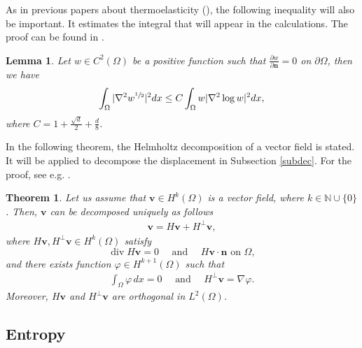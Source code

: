 \documentclass[11pt]{article}
\numberwithin{equation}{section}
\theoremstyle{plain}
\newtheorem{tw}[defi]{Theorem}
\newtheorem{lem}[defi]{Lemma}
\newcommand\bb[1]{\mathbf{#1}}
\newcommand{\n}{\mathbb{N}}
\newcommand{\tn}{\Omega}
\newcommand{\io}{\int_{\Omega}}
\newcommand{\sul}{\sfrac{1}{2}}
\newcommand{\hp}{H^{\perp}}
\newcommand{\ant}{\quad\textrm{ and }\quad}
\renewcommand{\div}{\operatorname{div}}
\let \phi\varphi
\begin{document}
As in previous papers about thermoelasticity (\cite{BC2, Biest, BC}), the following inequality will also be important. It estimates the integral that will appear in the calculations. The proof can be found in \cite{CFHS}.
\begin{lem}\label{theCin}
Let $w\in C^2(\Omega)$ be a positive function such that $\frac{\partial w}{\partial\bb n}=0$ on $\partial\Omega$, then we have
\begin{align*}
\io |\nabla^2w^{\sul}|^2dx\leq C\io w|\nabla^2\log w|^2dx,
\end{align*}
where $C=1+\frac{\sqrt d}2+\frac d8$.
\end{lem}
In the following theorem, the Helmholtz decomposition of a vector field is stated. It will be applied to decompose the displacement in Subsection \ref{subdec}. For the proof, see e.g. \cite{FN}.
\begin{tw}\label{thdecomp}
Let us assume that $\bb v\in H^k(\tn)$ is a vector field, where $k\in\n\cup\{0\}$. Then, $\bb v$ can be decomposed uniquely as follows
\begin{align*}
\bb v=H\bb v+\hp\bb v,
\end{align*}
where $H\bb v, \hp\bb v\in H^k(\tn)$ satisfy
\begin{equation*}
\div H\bb v=0\ant H\bb v\cdot\bb n\textrm{ on }\tn,
\end{equation*}
and there exists function $\phi\in H^{k+1}(\tn)$ such that
\begin{align*}
\io \phi\, dx=0\quad\textrm{ and }\quad\hp \bb v=\nabla\phi.
\end{align*}
Moreover, $H\bb v$ and $\hp\bb v$ are orthogonal in $L^2(\tn)$.
\end{tw}

\subsection{Entropy}\label{subent}
\end{document}
